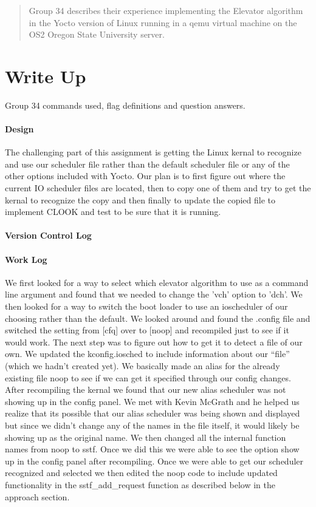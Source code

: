\documentclass[titlepage,draftclsnofoot,onecolumn]{article}
\begin{document}
\maketitle

\begin{abstract}
  Group 34 describes their experience implementing the Elevator algorithm in the Yocto version of Linux running in a qemu virtual machine on the OS2 Oregon State University server.
\end{abstract}

\section*{Write Up}
Group 34 commands used, flag definitions and question answers.

\paragraph{Design}
The challenging part of this assignment is getting the Linux kernal to recognize and use our scheduler file rather than the default scheduler file or any of the other options included with Yocto. Our plan is to first figure out where the current IO scheduler files are located, then to copy one of them and try to get the kernal to recognize the copy and then finally to update the copied file to implement CLOOK and test to be sure that it is running.

\paragraph{Version Control Log}

\paragraph{Work Log}
We first looked for a way to select which elevator algorithm to use as a command line argument and found that we needed to change the 'vch' option to 'dch'. We then looked for a way to switch the boot loader to use an ioscheduler of our choosing rather than the default. We looked around and found the .config file and switched the setting from [cfq] over to [noop] and recompiled just to see if it would work. The next step was to figure out how to get it to detect a file of our own. We updated the kconfig.iosched to include information about our “file” (which we hadn’t created yet). We basically made an alias for the already existing file noop to see if we can get it specified through our config changes. After recompiling the kernal we found that our new alias scheduler was not showing up in the config panel. We met with Kevin McGrath and he helped us realize that its possible that our alias scheduler was being shown and displayed but since we didn't change any of the names in the file itself, it would likely be showing up as the original name. We then changed all the internal function names from noop to sstf. Once we did this we were able to see the option show up in the config panel after recompiling. Once we were able to get our scheduler recognized and selected we then edited the noop code to include updated functionality in the sstf_add_request function as described below in the approach section.
\end{document}
